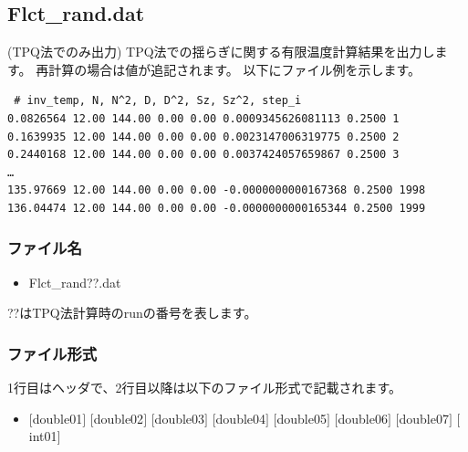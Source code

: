 \newpage
\subsection{Flct\_rand.dat}
\label{Subsec:flctrand}
(TPQ法でのみ出力) TPQ法での揺らぎに関する有限温度計算結果を出力します。
再計算の場合は値が追記されます。
以下にファイル例を示します。\\
\begin{minipage}{15cm}
\begin{screen}
\begin{verbatim}
 # inv_temp, N, N^2, D, D^2, Sz, Sz^2, step_i
0.0826564 12.00 144.00 0.00 0.00 0.0009345626081113 0.2500 1
0.1639935 12.00 144.00 0.00 0.00 0.0023147006319775 0.2500 2
0.2440168 12.00 144.00 0.00 0.00 0.0037424057659867 0.2500 3
…
135.97669 12.00 144.00 0.00 0.00 -0.0000000000167368 0.2500 1998
136.04474 12.00 144.00 0.00 0.00 -0.0000000000165344 0.2500 1999
\end{verbatim}
\end{screen}
\end{minipage}

\subsubsection{ファイル名}
 \begin{itemize}
   \item Flct\_rand??.dat
  \end{itemize}
  ??はTPQ法計算時のrunの番号を表します。

\subsubsection{ファイル形式}
1行目はヘッダで、2行目以降は以下のファイル形式で記載されます。
 \begin{itemize}
   \item $[$double01$]$ $[$double02$]$ $[$double03$]$ $[$double04$]$ $[$double05$]$ $[$double06$]$ $[$double07$]$ $[$int01$]$
  \end{itemize}

